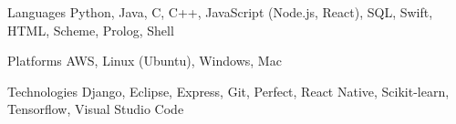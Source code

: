 \begin{cvskills}

\cvskill
    {Languages}
    {Python, Java, C, C++, JavaScript (Node.js, React), SQL, Swift, HTML, Scheme, Prolog, Shell}

\cvskill
    {Platforms}
    {AWS, Linux (Ubuntu), Windows, Mac}

\cvskill
    {Technologies}
    {Django, Eclipse, Express, Git, Perfect, React Native, Scikit-learn, Tensorflow, Visual Studio Code}

\end{cvskills}
